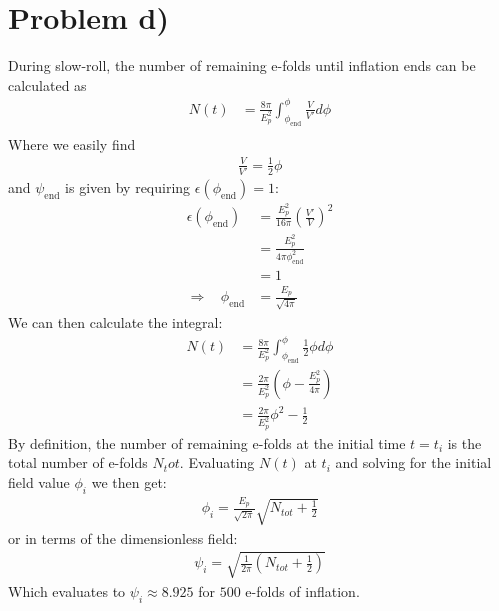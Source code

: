 \documentclass[reprint,english,notitlepage]{revtex4-1}  %
\numberwithin{equation}{section}
\begin{document}
\section{Problem d)}
During slow-roll, the number of remaining e-folds until inflation ends can be
calculated as
\begin{align}
	N(t) &= \frac{8\pi}{E_p^2} \int_{\phi_{\mathrm{end}}}^\phi \frac{V}{V'} d\phi \\
\end{align}
Where we easily find
\begin{align}
	\frac{V}{V'} = \frac{1}{2}\phi
\end{align}
and $\psi_{\mathrm{end}}$ is given by requiring $\epsilon(\phi_{\mathrm{end}})=1$:
\begin{align}
	\epsilon(\phi_{\mathrm{end}}) &= \frac{E_p^2}{16\pi} \left(\frac{V'}{V}\right)^2 \\
											 &= \frac{E_p^2}{4\pi \phi_{\mathrm{end}}^2} \\
											 &= 1 \\
	\Rightarrow \ \ \ \ \phi_{\mathrm{end}} &= \frac{E_p}{\sqrt{4\pi}}
\end{align}
We can then calculate the integral:
\begin{align}
	N(t) &= \frac{8\pi}{E_p^2} \int_{\phi_{\mathrm{end}}}^\phi \frac{1}{2}\phi d\phi \\
					&= \frac{2\pi}{E_p^2} \left(\phi -\frac{E_p^2}{4\pi} \right) \\
					&= \frac{2\pi}{E_p^2} \phi^2 - \frac{1}{2}
\end{align}
By definition, the number of remaining e-folds at the initial time $t=t_i$ is
the total number of e-folds $N_tot$. Evaluating $N(t)$ at $t_i$ and solving for
the initial field value $\phi_i$ we then get:
\begin{align}
	\phi_i = \frac{E_p}{\sqrt{2\pi}}\sqrt{N_{tot} + \frac{1}{2}}
\end{align}
or in terms of the dimensionless field:
\begin{align}
	\psi_i = \sqrt{ \frac{1}{2\pi} \left(N_{tot} + \frac{1}{2} \right) }
\end{align}
Which evaluates to $\psi_i \approx 8.925$ for $500$ e-folds of inflation.
\end{document}

